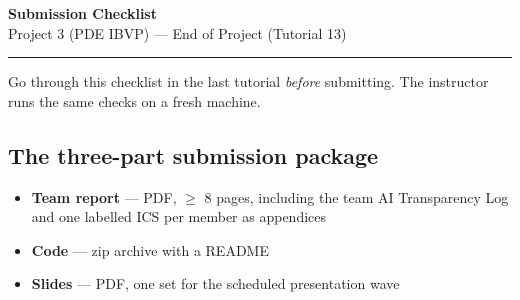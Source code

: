 \documentclass[11pt]{article}
\begin{document}
\begin{center}
  {\LARGE\bfseries Submission Checklist}\\[0.4em]
  {\large Project 3 (PDE IBVP) --- End of Project (Tutorial 13)}
\end{center}
\vspace{0.2em}
\hrule
\vspace{0.6em}

Go through this checklist in the last tutorial \emph{before} submitting. The
instructor runs the same checks on a fresh machine.

\subsection*{The three-part submission package}
\begin{itemize}[leftmargin=2.4em, itemsep=1pt]
  \item[$\square$] \textbf{Team report} --- PDF, $\geq$ 8 pages, including the
  team AI Transparency Log and one labelled ICS per member as appendices
  \item[$\square$] \textbf{Code} --- zip archive with a README
  \item[$\square$] \textbf{Slides} --- PDF, one set for the scheduled presentation wave
\end{itemize}

\end{document}
